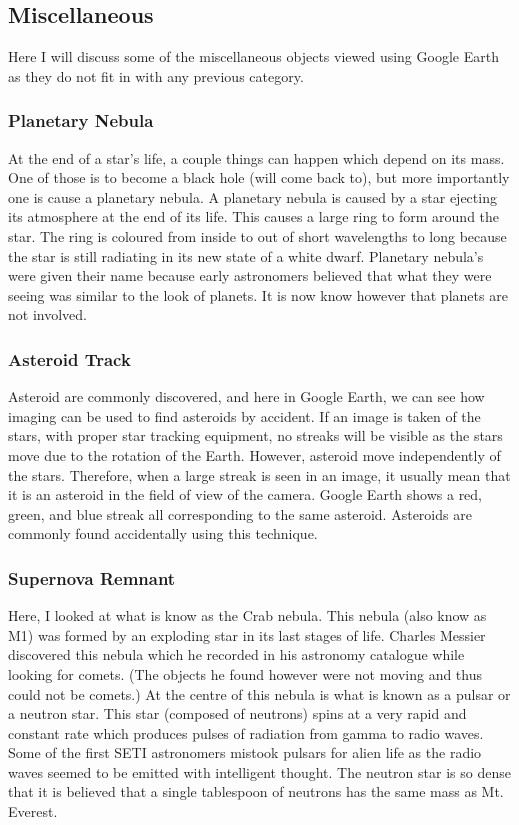 \documentclass{article}
\begin{document}
\subsection{Miscellaneous}
Here I will discuss some of the miscellaneous objects viewed using Google Earth as they
do not fit in with any previous category.

\subsubsection{Planetary Nebula}
At the end of a star's life, a couple things can happen which depend on its mass. One of those
is to become a black hole (will come back to), but more importantly one is cause a planetary
nebula. A planetary nebula is caused by a star ejecting its atmosphere at the end of its life.
This causes a large ring to form around the star. The ring is coloured from inside to out 
of short wavelengths to long because the star is still radiating in its new state of a white
dwarf. Planetary nebula's were given their name because early astronomers believed that what
they were seeing was similar to the look of planets. It is now know however that planets
are not involved.

\subsubsection{Asteroid Track}
Asteroid are commonly discovered, and here in Google Earth, we can see how imaging can be
used to find asteroids by accident. If an image is taken of the stars, with proper star
tracking equipment, no streaks will be visible as the stars move due to the rotation of
the Earth. However, asteroid move independently of the stars. Therefore, when a large streak 
is seen in an image, it usually mean that it is an asteroid in the field of view of the
camera. Google Earth shows a red, green, and blue streak all corresponding to the same
asteroid. Asteroids are commonly found accidentally using this technique.

\subsubsection{Supernova Remnant}
Here, I looked at what is know as the Crab nebula. This nebula (also know as M1) was formed
by an exploding star in its last stages of life. Charles Messier discovered this nebula which
he recorded in his astronomy catalogue while looking for comets. (The objects he found however
were not moving and thus could not be comets.) At the centre of this nebula is what is known
as a pulsar or a neutron star. This star (composed of neutrons) spins at a very rapid and
constant rate which produces pulses of radiation from gamma to radio waves. Some of the first
SETI astronomers mistook pulsars for alien life as the radio waves seemed to be emitted with
intelligent thought. The neutron star is so dense that it is believed that a single tablespoon
of neutrons has the same mass as Mt. Everest. 
\end{document}
